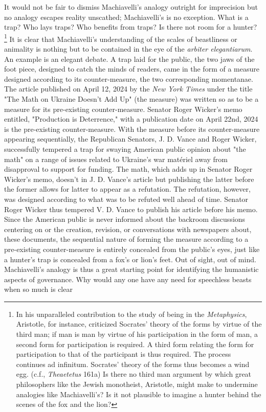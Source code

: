 \documentclass[10pt,a4paper,twoside]{article} %
\begin{document}
\begin{multicols}{2}
{\newline \indent It would not be fair to dismiss Machiavelli's analogy outright for imprecision but no analogy escapes reality unscathed; Machiavelli's is no exception. What is a trap? Who lays traps? Who benefits from traps? Is there not room for a hunter? \footnote{In his unparalleled contribution to the study of being in the \emph{Metaphysics}, Aristotle, for instance, criticized Socrates' theory of the forms by virtue of the third man; if man is man by virtue of his participation in the form of man, a second form for participation is required. A third form relating the form for participation to that of the participant is thus required. The process continues ad infinitum. Socrates' theory of the forms thus becomes a wind egg. (c.f., \emph{Theaetetus} 161a) Is there no third man argument by which great philosophers like the Jewish monotheist, Aristotle, might make to undermine analogies like Machiavelli's? Is it not plausible to imagine a hunter behind the scenes of the fox and the lion? } \newline \indent It is clear that Machiavelli's understanding of the scales of beastliness or animality is nothing but to be contained in the eye of the \emph{arbiter elegantiarum}. An example is an elegant debate. A trap laid for the public, the two jaws of the foot piece, designed to catch the minds of readers, came in the form of a measure designed according to its counter-measure, the two corresponding momentanae.  \newline \indent The article published on April 12, 2024 by the \emph{New York Times} under the title "The Math on Ukraine Doesn't Add Up"  (the measure) was written so as to be a measure for its pre-existing counter-measure. Senator Roger Wicker's memo entitled, "Production is Deterrence," with a publication date on April 22nd, 2024 is the pre-existing counter-measure. With the measure before its counter-measure appearing sequentially, the Republican Senators, J. D. Vance and Roger Wicker, successfully tempered a trap for swaying American public opinion about "the math" on a range of issues related to Ukraine's war \textfrench{matériel} away from disapproval to support for funding. The math, which adds up in Senator Roger Wicker's memo, doesn't in J. D. Vance's article but publishing the latter before the former allows for latter to appear as a refutation. The refutation, however, was designed according to what was to be refuted well ahead of time. Senator Roger Wicker thus tempered V. D. Vance to publish his article before his memo.  \newline \indent Since the American public is never informed about the backroom discussions centering on or the creation, revision, or conversations with newspapers about, these documents, the sequential nature of forming the measure according to a pre-existing counter-measure is entirely concealed from the public's eyes, just like a hunter's trap is concealed from a fox's or lion's feet. Out of sight, out of mind. Machiavelli's analogy is thus a great starting point for identifying the humanistic aspects of governance. Why would any one have any need for speechless beasts when so much is clear }
\end{multicols}
\end{document}
